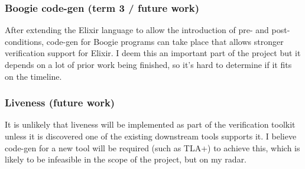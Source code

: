 \subsubsection[]{Boogie code-gen (term 3 / future work)}
After extending the Elixir language to allow the introduction of pre- and post-conditions, code-gen for Boogie programs can take place that allows stronger verification support for Elixir. I deem this an important part of the project but it depends on a lot of prior work being finished, so it's hard to determine if it fits on the timeline.
\subsubsection[]{Liveness (future work)}
It is unlikely that liveness will be implemented as part of the verification toolkit unless it is discovered one of the existing downstream tools supports it. I believe code-gen for a new tool will be required (such as TLA+) to achieve this, which is likely to be infeasible in the scope of the project, but on my radar.